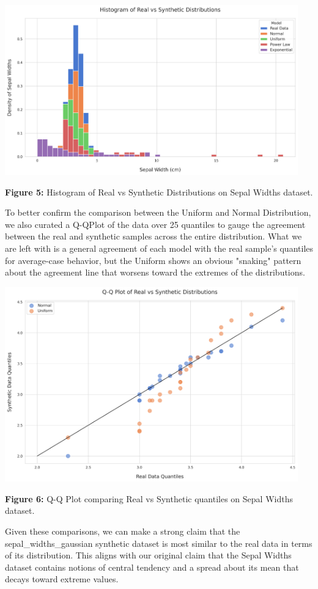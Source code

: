 \begin{center}
  \includegraphics[width=0.95\textwidth]{figures/normal/histogram.png}
  
  \textbf{Figure 5:} Histogram of Real vs Synthetic Distributions on Sepal Widths dataset.
\end{center}

To better confirm the comparison between the Uniform and Normal Distribution, we also curated a Q-QPlot of the data over 25 quantiles to gauge the agreement between the real and synthetic samples across the entire distribution. What we are left with is a general agreement of each model with the real sample's quantiles for average-case behavior, but the Uniform shows an obvious "snaking" pattern about the agreement line that worsens toward the extremes of the distributions.\\ 

\begin{center}
  \includegraphics[width=0.95\textwidth]{figures/normal/qqplot.png}
  
  \textbf{Figure 6:} Q-Q Plot comparing Real vs Synthetic quantiles on Sepal Widths dataset.
\end{center}

Given these comparisons, we can make a strong claim that the sepal\_widths\_gaussian synthetic dataset is most similar to the real data in terms of its distribution. This aligns with our original claim that the Sepal Widths dataset contains notions of central tendency and a spread about its mean that decays toward extreme values.
\newpage
